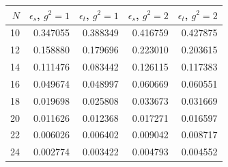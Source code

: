 \begin{tabular}{@{}rrrrr@{}}\toprule
$N$ & $\epsilon_s$, $g^2=1$ & $\epsilon_t$, $g^2=1$ & $\epsilon_s$, $g^2=2$ & $\epsilon_t$, $g^2=2$\\\midrule
10 & 0.347055 & 0.388349 & 0.416759 & 0.427875\\
12 & 0.158880 & 0.179696 & 0.223010 & 0.203615\\
14 & 0.111476 & 0.083442 & 0.126115 & 0.117383\\
16 & 0.049674 & 0.048997 & 0.060669 & 0.060551\\
18 & 0.019698 & 0.025808 & 0.033673 & 0.031669\\
20 & 0.011626 & 0.012368 & 0.017271 & 0.016597\\
22 & 0.006026 & 0.006402 & 0.009042 & 0.008717\\
24 & 0.002774 & 0.003422 & 0.004793 & 0.004552\\
\bottomrule\end{tabular}
